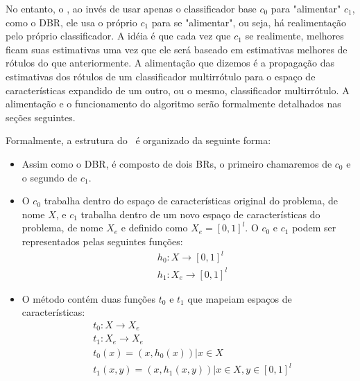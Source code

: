No entanto, o \MRLMa, ao invés de usar apenas o classificador base $c_0$ para "alimentar" $c_1$, como o DBR,
ele usa o próprio $c_1$ para se "alimentar", ou seja, há realimentação pelo próprio classificador.
A idéia é que cada vez que $c_1$ se realimente, melhores ficam suas estimativas uma vez que ele será baseado
em estimativas melhores de rótulos do que anteriormente. 
A alimentação que dizemos é a propagação das 
estimativas dos rótulos de um classificador multirrótulo para o espaço de características expandido de um outro, ou o mesmo,
classificador multirrótulo. A alimentação e o funcionamento do algoritmo serão formalmente detalhados nas seções seguintes.

Formalmente, a estrutura do \MRLMa~é organizado da seguinte forma:
\begin{itemize}
  \item Assim como o DBR, é composto de dois BRs, o primeiro chamaremos de $c_0$ e o segundo de $c_1$. 

  \item O $c_0$ trabalha dentro do espaço de características original do problema, de nome $X$,
  e $c_1$ trabalha dentro de um novo espaço de características do problema, de nome $X_e$ e
   definido como $X_e=[0,1]^{l}$. O $c_0$ e $c_1$ podem ser
  representados pelas seguintes funções:
  \begin{equation}
  \begin{split}
   & h_0 : X \rightarrow [0,1]^l \\
   & h_1 : X_e \rightarrow [0,1]^l
   \end{split}
  \end{equation}
  \item O método contém duas funções $t_0$ e $t_1$ que mapeiam espaços de características:
   \begin{equation}
 \begin{split}
    & t_0 : X \rightarrow X_e \\
    & t_1 : X_e \rightarrow X_e \\
    & t_0(x)=(x,h_0(x)) | x \in X \\
    & t_1(x,y)=(x,h_1(x,y)) | x \in X,  y \in [0,1]^{l}
  \end{split}
 \end{equation}
  
\end{itemize}

